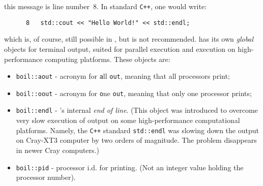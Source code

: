 this message is line number~8. In standard {\tt C++}, one would write:
%
{\small \begin{verbatim}
      8   std::cout << "Hello World!" << std::endl;
\end{verbatim}}
%
which is, of course, still possible in {\psiboil}, but is not recommended.
{\psiboil} has its own {\em global} objects for terminal output, suited
for parallel execution and execution on high-performance computing platforms. 
These objects are:
%
\begin{itemize}
  \item {\tt boil::aout} - acronym for {\tt a}ll {\tt out}, meaning that all 
                           processors print;
  \item {\tt boil::oout} - acronym for {\tt o}ne {\tt out}, meaning that only 
                           one processor prints;
  \item {\tt boil::endl} - {\psiboil}'s internal {\em end of line}. (This 
                           object was introduced to overcome very slow execution
                           of output on some high-performance computational platforms.
                           Namely, the {\tt C++} standard {\tt std::endl} was slowing
                           down the output on Cray-XT3 computer by two orders of 
                           magnitude. The problem disappears in newer Cray computers.) 
  \item {\tt boil::pid} - processor i.d. for printing. (Not an integer value holding
                          the processor number). 
\end{itemize}
%

